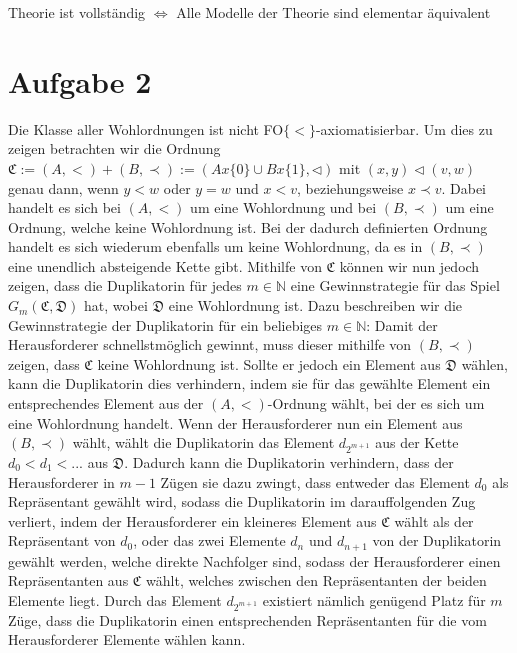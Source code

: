 \documentclass[11pt, a4paper]{article}
\begin{document}
Theorie ist vollständig $\iff$ Alle Modelle der Theorie sind elementar äquivalent



\section*{Aufgabe 2}
Die Klasse aller Wohlordnungen ist nicht FO$\{<\}$-axiomatisierbar. Um dies zu zeigen betrachten wir die Ordnung $\mathfrak{C} := (A, <) + (B, \prec) := (A x \{0\} \cup B x \{1\}, \triangleleft)$ mit $(x,y) \triangleleft (v, w)$ genau dann, wenn $y < w$ oder $y = w$ und $x < v$, beziehungsweise $x \prec v$. Dabei handelt es sich bei $(A, <)$ um eine Wohlordnung und bei $(B, \prec)$ um eine Ordnung, welche keine Wohlordnung ist. Bei der dadurch definierten Ordnung handelt es sich wiederum ebenfalls um keine Wohlordnung, da es in $(B, \prec)$ eine unendlich absteigende Kette gibt.\newline
Mithilfe von $\mathfrak{C}$ können wir nun jedoch zeigen, dass die Duplikatorin für jedes $m \in \mathbb{N}$ eine Gewinnstrategie für das Spiel $G_m(\mathfrak{C}, \mathfrak{D})$ hat, wobei $\mathfrak{D}$ eine Wohlordnung ist. Dazu beschreiben wir die Gewinnstrategie der Duplikatorin für ein beliebiges $m \in \mathbb{N}$: \newline
Damit der Herausforderer schnellstmöglich gewinnt, muss dieser mithilfe von $(B, \prec)$ zeigen, dass $\mathfrak{C}$ keine Wohlordnung ist. Sollte er jedoch ein Element aus $\mathfrak{D}$ wählen, kann die Duplikatorin dies verhindern, indem sie für das gewählte Element ein entsprechendes Element aus der $(A, <)$-Ordnung wählt, bei der es sich um eine Wohlordnung handelt. Wenn der Herausforderer nun ein Element aus $(B, \prec)$ wählt, wählt die Duplikatorin das Element $d_{2^{m+1}}$ aus der Kette $d_0<d_1<...$ aus $\mathfrak{D}$. Dadurch kann die Duplikatorin verhindern, dass der Herausforderer in $m-1$ Zügen sie dazu zwingt, dass entweder das Element $d_0$ als Repräsentant gewählt wird, sodass die Duplikatorin im darauffolgenden Zug verliert, indem der Herausforderer ein kleineres Element aus $\mathfrak{C}$ wählt als der Repräsentant von $d_0$, oder das zwei Elemente $d_n$ und $d_{n+1}$ von der Duplikatorin gewählt werden, welche direkte Nachfolger sind, sodass der Herausforderer einen Repräsentanten aus $\mathfrak{C}$ wählt, welches zwischen den Repräsentanten der beiden Elemente liegt. Durch das Element $d_{2^{m+1}}$ existiert nämlich genügend Platz für $m$ Züge, dass die Duplikatorin einen entsprechenden Repräsentanten für die vom Herausforderer Elemente wählen kann.\newline 
\end{document}
